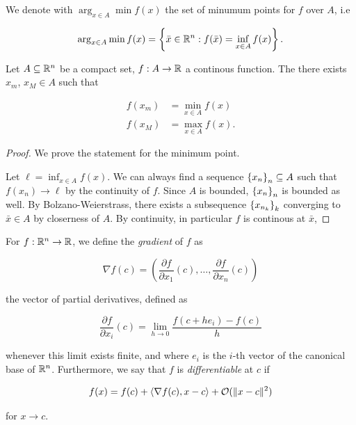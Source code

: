 \begin{definition}
    
    We denote with $\arg_{x \in A}\min f(x)$ the set of minumum points for $f$ over $A$, i.e 

    \[ \arg_{x \in A}\min f(x) = \left\{ \bar{x} \in {\mathbb{R}^n} : f(\bar{x}) = \inf_{x \in A} f(x) \right\}. \]

\end{definition}

\begin{theorem}[Weierstrass]

    Let $A \subseteq {\mathbb{R}^n}$ be a compact set, $f : A \to \mathbb{R}$ a continous function. The there exists $x_m$, $x_M \in A$ such that
    
    \begin{align*}
        f(x_m) &= \min_{x \in A} f(x) \\
        f(x_M) &= \max_{x \in A} f(x).
    \end{align*}
    
\end{theorem}

\begin{proof}
    
    We prove the statement for the minimum point. 

    Let $\ell = \displaystyle\inf_{x \in A} f(x)$. We can always find a sequence $\left\{ x_n \right\}_n \subseteq A$ such that $f(x_n) \to \ell$ by the continuity of $f$. Since $A$ is bounded, $\left\{ x_n \right\}_n$ is bounded as well. By Bolzano-Weierstrass, there exists a subsequence $\left\{ x_{n_k} \right\}_k$ converging to $\bar{x} \in A$ by closerness of $A$. By continuity, in particular $f$ is continous at $\bar{x}$, 

\end{proof}

\begin{remark}
    
    For $f : {\mathbb{R}^n} \to \mathbb{R}$, we define the \emph{gradient} of $f$ as 

    \[ \nabla f(c) = \left( \frac{\partial f}{\partial x_1}(c), \dots, \frac{\partial f}{\partial x_n}(c) \right) \]

    the vector of partial derivatives, defined as

    \[ \frac{\partial f}{\partial x_i}(c) = \lim_{h \to 0} \frac{f(c + he_i) - f(c)}{h} \]

    whenever this limit exists finite, and where $e_i$ is the $i$-th vector of the canonical base of ${\mathbb{R}^n}$. Furthermore, we say that $f$ is \emph{differentiable}   at $c$ if

    \[ f(x) = f(c) + \langle \nabla f(c), x - c \rangle + \mathcal{O}(\lVert x - c \rVert^2) \]

    for $x \to c$.

\end{remark}

